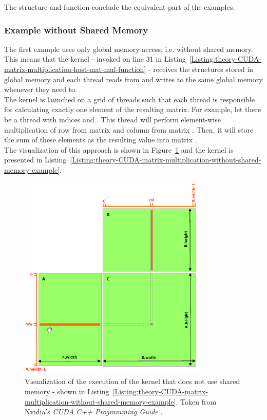The  structure and  function conclude the equivalent part of the examples.

\subsubsection{Example without Shared Memory}
The first example uses only global memory access, i.e. without shared memory. This means that the kernel - invoked on line 31 in Listing~\ref{Listing:theory-CUDA-matrix-multiplication-host-mat-mul-function} - receives the  structures stored in global memory and each thread reads from and writes to the same global memory whenever they need to. \\
The kernel is launched on a grid of threads such that each thread is responsible for calculating exactly one element of the resulting  matrix. For example, let there be a thread with indices  and . This thread will perform element-wise multiplication of row  from matrix  and column  from matrix . Then, it will store the sum of these elements as the resulting value  into matrix . \\
The visualization of this approach is shown in Figure~\ref{Figure:theory-CUDA-matrix-multiplication-without-shared-memory-example} and the kernel is presented in Listing~\ref{Listing:theory-CUDA-matrix-multiplication-without-shared-memory-example}.

\begin{figure}[ht!]
	\centering
	\includegraphics[width=0.8\textwidth, keepaspectratio]{images/ch1/CUDA-matrix-multiplication-without-shared-memory.png}
	\caption{Visualization of the execution of the kernel that does not use shared memory - shown in Listing~\ref{Listing:theory-CUDA-matrix-multiplication-without-shared-memory-example}. Taken from Nvidia's \emph{CUDA C++ Programming Guide} \cite{NVIDIAMay2022}.}
	\label{Figure:theory-CUDA-matrix-multiplication-without-shared-memory-example}
\end{figure}

